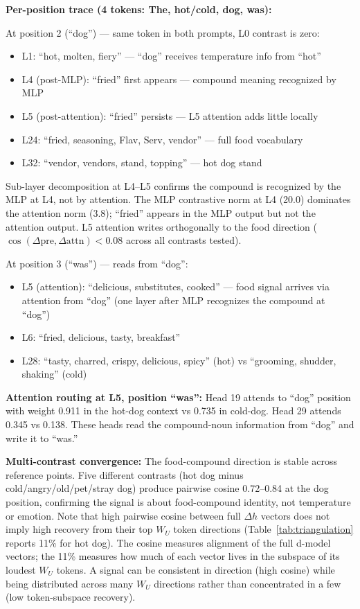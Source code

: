 \documentclass[11pt]{article}
\newcommand{\dhh}{\Delta h}
\newcommand{\WU}{W_U}
\begin{document}
\textbf{Per-position trace (4 tokens: The, hot/cold, dog, was):}

At position 2 (``dog'') --- same token in both prompts, L0 contrast is zero:
\begin{itemize}[leftmargin=*]
\item L1: ``hot, molten, fiery'' --- ``dog'' receives temperature info from ``hot''
\item L4 (post-MLP): ``fried'' first appears --- compound meaning recognized by MLP
\item L5 (post-attention): ``fried'' persists --- L5 attention adds little locally
\item L24: ``fried, seasoning, Flav, Serv, vendor'' --- full food vocabulary
\item L32: ``vendor, vendors, stand, topping'' --- hot dog stand
\end{itemize}

Sub-layer decomposition at L4--L5 confirms the compound is recognized by the
MLP at L4, not by attention. The MLP contrastive norm at L4 (20.0) dominates
the attention norm (3.8); ``fried'' appears in the MLP output but not the
attention output. L5 attention writes orthogonally to the food direction
($\cos(\Delta\text{pre}, \Delta\text{attn}) < 0.08$ across all contrasts tested).

At position 3 (``was'') --- reads from ``dog'':
\begin{itemize}[leftmargin=*]
\item L5 (attention): ``delicious, substitutes, cooked'' --- food signal arrives via
  attention from ``dog'' (one layer after MLP recognizes the compound at ``dog'')
\item L6: ``fried, delicious, tasty, breakfast''
\item L28: ``tasty, charred, crispy, delicious, spicy'' (hot) vs ``grooming, shudder, shaking'' (cold)
\end{itemize}

\textbf{Attention routing at L5, position ``was'':}
Head 19 attends to ``dog'' position with weight 0.911 in the hot-dog context vs
0.735 in cold-dog. Head 29 attends 0.345 vs 0.138. These heads read the
compound-noun information from ``dog'' and write it to ``was.''

\textbf{Multi-contrast convergence:} The food-compound direction is stable across
reference points. Five different contrasts (hot dog minus cold/angry/old/pet/stray
dog) produce pairwise cosine 0.72--0.84 at the dog position, confirming
the signal is about food-compound identity, not temperature or emotion. Note
that high pairwise cosine between full $\dhh$ vectors does not imply high
recovery from their top $\WU$ token directions (Table~\ref{tab:triangulation} reports 11\% for hot
dog). The cosine measures alignment of the full d-model vectors; the 11\%
measures how much of each vector lives in the subspace of its loudest $\WU$
tokens. A signal can be consistent in direction (high cosine) while being
distributed across many $\WU$ directions rather than concentrated in a few
(low token-subspace recovery).
\end{document}
